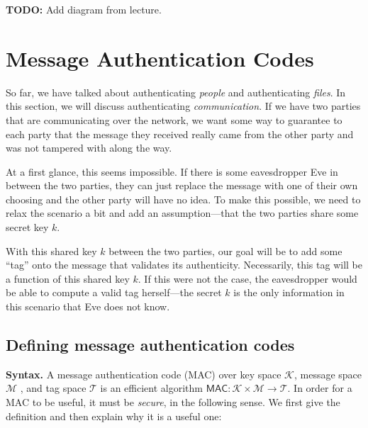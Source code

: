 \documentclass[
  letterpaper,
]{scrbook}
\newcommand{\calK}{\mathcal{K}}
\newcommand{\calM}{\mathcal{M}}
\newcommand{\calT}{\mathcal{T}}
\newcommand{\MAC}{\mathsf{MAC}}
\newcommand{\todobox}[1]{{\color{todocolor}#1}}
\theoremstyle{definition}
\theoremstyle{plain}
\theoremstyle{plain}
\theoremstyle{remark}
\begin{document}
\todobox{\textbf{TODO:} Add diagram from lecture.}

\chapter{Message Authentication Codes}\label{sec-mac}

So far, we have talked about authenticating \emph{people} and
authenticating \emph{files}. In this section, we will discuss
authenticating \emph{communication}. If we have two parties that are
communicating over the network, we want some way to guarantee to each
party that the message they received really came from the other party
and was not tampered with along the way.

At a first glance, this seems impossible. If there is some eavesdropper
Eve in between the two parties, they can just replace the message with
one of their own choosing and the other party will have no idea. To make
this possible, we need to relax the scenario a bit and add an
assumption---that the two parties share some secret key \(k\).

With this shared key \(k\) between the two parties, our goal will be to
add some ``tag'' onto the message that validates its authenticity.
Necessarily, this tag will be a function of this shared key \(k\). If
this were not the case, the eavesdropper would be able to compute a
valid tag herself---the secret \(k\) is the only information in this
scenario that Eve does not know.

\section{Defining message authentication
codes}\label{defining-message-authentication-codes}

\textbf{Syntax.} A message authentication code (MAC) over key space
\(\mathcal{K}\), message space \(\mathcal{M}\) , and tag space \(\calT\)
is an efficient algorithm \(\MAC \colon \calK \times \calM \to \calT\).
In order for a MAC to be useful, it must be \emph{secure}, in the
following sense. We first give the definition and then explain why it is
a useful one:
\end{document}
